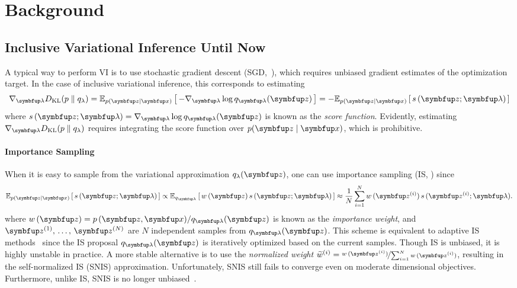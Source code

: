 
\section{Background}
\vspace{-0.05in}
\subsection{Inclusive Variational Inference Until Now}\label{section:ivi_previous}
\vspace{-0.05in}
A typical way to perform VI is to use stochastic gradient descent (SGD,~\citealt{robbins_stochastic_1951, bottou_online_1999}), which requires unbiased gradient estimates of the optimization target.
In the case of inclusive variational inference, this corresponds to estimating
%
\begin{align}
  \nabla_{\vlambda} \DKL{p}{q_{\lambda}}
  = \Esub{p(\vz\mid\vx)}{ - \nabla_{\vlambda} \log q_{\vlambda}(\vz) }
  = - \Esub{p(\vz\mid\vx)}{ s\,(\vz; \vlambda) }
\end{align}
where \(s\,(\vz; \vlambda) = \nabla_{\vlambda} \log q_{\vlambda}(\vz)\) is known as the \textit{score function}.
Evidently, estimating \(\nabla_{\vlambda} \DKL{p}{q_{\lambda}}\) requires integrating the score function over \(p(\vz\mid\vx)\), which is prohibitive.

\vspace{-0.1in}
\paragraph{Importance Sampling}
When it is easy to sample from the variational approximation \(q_{\lambda}(\vz)\), one can use importance sampling (IS, \citealt{robert_monte_2004, mcbook}) since 
\begin{align}
  \Esub{p(\vz\mid\vx)}{ s\,(\vz; \vlambda) }
  \propto \Esub{q_{\vlambda}}{ w\,(\vz) \, s\,(\vz; \vlambda) }
  \approx \frac{1}{N} \sum^{N}_{i=1} w\,(\vz^{(i)}) \, s\,(\vz^{(i)}; \vlambda) .
\end{align}
where \(w\,(\vz) = p\,(\vz,\vx) / q_{\vlambda}(\vz)\) is known as the \textit{importance weight}, and \(\vz^{(1)},\, \ldots,\, \vz^{(N)}\) are \(N\) independent samples from \(q_{\vlambda}(\vz)\).
This scheme is equivalent to adaptive IS methods~\citep{cappe_adaptive_2008, bugallo_adaptive_2017} since the IS proposal \(q_{\vlambda}(\vz)\) is iteratively optimized based on the current samples.
Though IS is unbiased, it is highly unstable in practice.
A more stable alternative is to use the \textit{normalized weight} \(\widetilde{w}^{(i)} = \nicefrac{w\,(\vz^{(i)})}{\sum_{i=1}^N w\,(\vz^{(i)}) }\), resulting in the self-normalized IS (SNIS) approximation.
Unfortunately, SNIS still fails to converge even on moderate dimensional objectives.
Furthermore, unlike IS, SNIS is no longer unbiased~\citep{robert_monte_2004, mcbook}.

